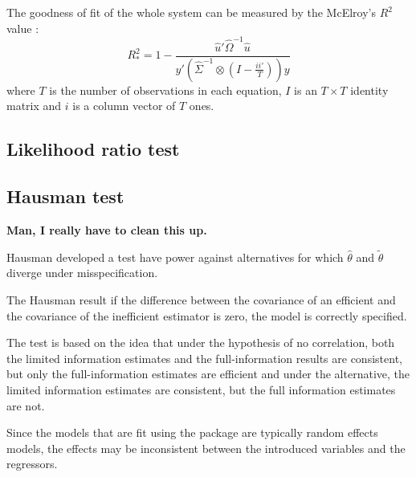The goodness of fit of the whole system can be measured by the
McElroy's $R^2$ value \citep{mcelroy77}: 
\begin{equation}
   R_*^2 = 1 - \frac{ \widehat{u}' \widehat{ \Omega }^{-1} \widehat{u} }
   { y' \left( \widehat{ \Sigma }^{-1} \otimes
   \left( I - \frac{i i'}{T} \right) \right) y }
\end{equation}
where $T$ is the number of observations in each equation,
$I$ is an $T \times T$ identity matrix and 
$i$ is a column vector of $T$ ones.


\subsection{Likelihood ratio test}

\subsection{Hausman test}

\textbf{Man, I really have to clean this up.}

Hausman \citep{hausman1978} developed a test have power against
alternatives for which $\hat{\theta}$ and $\tilde{\theta}$ diverge
under misspecification.

The Hausman result if the difference between the covariance of an
efficient and the covariance of the inefficient estimator is zero, the
model is correctly specified.  

The test is based on the idea that under the hypothesis of no
correlation, both the limited information estimates and the
full-information results are consistent, but only the full-information
estimates are efficient and under the alternative, the limited
information estimates are consistent, but the full information
estimates are not. 

Since the models that are fit using the  package are
typically random effects models, the effects may be inconsistent
between the introduced variables and the regressors.

